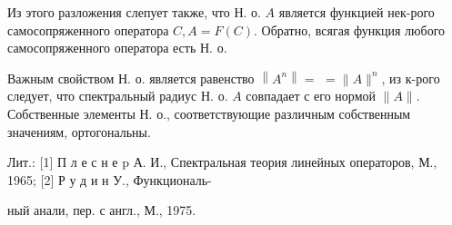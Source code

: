 \documentclass[10pt]{article}
\begin{document}
Из этого разложения слепует также, что Н. о. $A$ является функцией нек-рого самосопряженного оператора $C, A=F(C)$. Обратно, всягая функция любого самосопряженного оператора есть Н. о.



Важным свойством Н. о. является равенство $\left\|A^{n}\right\|=$ $=\|A\|^{n}$, из к-рого следует, что спектральный радиус Н. о. $A$ совпадает с его нормой $\|A\|$. Собственные элементы Н. о., соответствующие различным собственным значениям, ортогональны.



Лит.: [1] П л е с н е p А. И., Спектральная теория линейных операторов, М., 1965; [2] Р у д и н У., Функциональ-

ный анали, пер. с англ., М., 1975.
\end{document}
